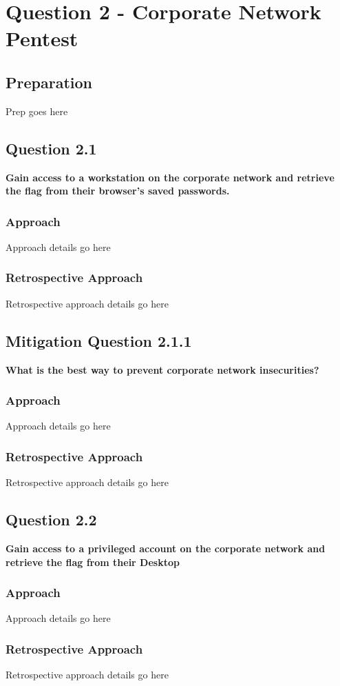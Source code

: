 \chapter{Question 2 - Corporate Network Pentest}

\section{Preparation}
Prep goes here

\section{Question 2.1}
\textbf{Gain access to a workstation on the corporate network and retrieve the
flag from their browser's saved passwords.}
\subsection{Approach}
Approach details go here
\subsection{Retrospective Approach}
Retrospective approach details go here

\section{Mitigation Question 2.1.1}
\textbf{What is the best way to prevent corporate network insecurities?}
\subsection{Approach}
Approach details go here
\subsection{Retrospective Approach}
Retrospective approach details go here

\section{Question 2.2}
\textbf{Gain access to a privileged account on the corporate network and
retrieve the flag from their Desktop}
\subsection{Approach}
Approach details go here
\subsection{Retrospective Approach}
Retrospective approach details go here

